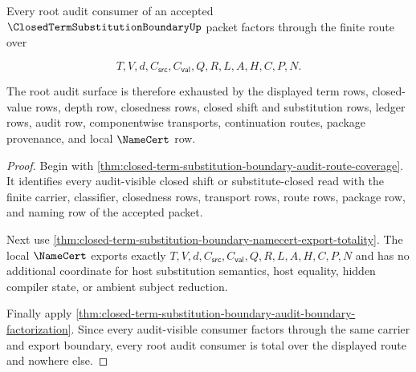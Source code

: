 \begin{theorem}
\label{thm:closed-term-substitution-boundary-root-audit-totality}
Every root audit consumer of an accepted $\ClosedTermSubstitutionBoundaryUp$ packet factors through the finite route over

$$
T,V,d,C_{\mathsf{src}},C_{\mathsf{val}},Q,R,L,A,H,C,P,N.
$$

The root audit surface is therefore exhausted by the displayed term rows, closed-value rows, depth row, closedness rows, closed shift and substitution rows, ledger rows, audit row, componentwise transports, continuation routes, package provenance, and local $\NameCert$ row.
\end{theorem}
\begin{proof}
Begin with \autoref{thm:closed-term-substitution-boundary-audit-route-coverage}. It identifies every audit-visible closed shift or substitute-closed read with the finite carrier, classifier, closedness rows, transport rows, route rows, package row, and naming row of the accepted packet.

Next use \autoref{thm:closed-term-substitution-boundary-namecert-export-totality}. The local $\NameCert$ exports exactly $T,V,d,C_{\mathsf{src}},C_{\mathsf{val}},Q,R,L,A,H,C,P,N$ and has no additional coordinate for host substitution semantics, host equality, hidden compiler state, or ambient subject reduction.

Finally apply \autoref{thm:closed-term-substitution-boundary-audit-boundary-factorization}. Since every audit-visible consumer factors through the same carrier and export boundary, every root audit consumer is total over the displayed route and nowhere else.
\end{proof}
